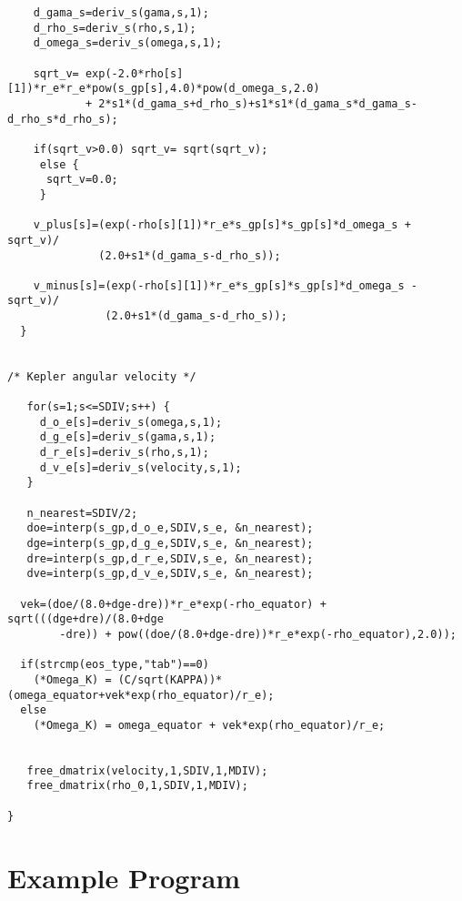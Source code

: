 \begin{verbatim}
    d_gama_s=deriv_s(gama,s,1);
    d_rho_s=deriv_s(rho,s,1);
    d_omega_s=deriv_s(omega,s,1);

    sqrt_v= exp(-2.0*rho[s][1])*r_e*r_e*pow(s_gp[s],4.0)*pow(d_omega_s,2.0) 
            + 2*s1*(d_gama_s+d_rho_s)+s1*s1*(d_gama_s*d_gama_s-d_rho_s*d_rho_s);

    if(sqrt_v>0.0) sqrt_v= sqrt(sqrt_v);
     else {
      sqrt_v=0.0;
     }

    v_plus[s]=(exp(-rho[s][1])*r_e*s_gp[s]*s_gp[s]*d_omega_s + sqrt_v)/
              (2.0+s1*(d_gama_s-d_rho_s));

    v_minus[s]=(exp(-rho[s][1])*r_e*s_gp[s]*s_gp[s]*d_omega_s - sqrt_v)/
               (2.0+s1*(d_gama_s-d_rho_s));
  }


/* Kepler angular velocity */

   for(s=1;s<=SDIV;s++) { 
     d_o_e[s]=deriv_s(omega,s,1);
     d_g_e[s]=deriv_s(gama,s,1);
     d_r_e[s]=deriv_s(rho,s,1);
     d_v_e[s]=deriv_s(velocity,s,1);
   }

   n_nearest=SDIV/2; 
   doe=interp(s_gp,d_o_e,SDIV,s_e, &n_nearest);
   dge=interp(s_gp,d_g_e,SDIV,s_e, &n_nearest);
   dre=interp(s_gp,d_r_e,SDIV,s_e, &n_nearest);
   dve=interp(s_gp,d_v_e,SDIV,s_e, &n_nearest);

  vek=(doe/(8.0+dge-dre))*r_e*exp(-rho_equator) + sqrt(((dge+dre)/(8.0+dge
        -dre)) + pow((doe/(8.0+dge-dre))*r_e*exp(-rho_equator),2.0));

  if(strcmp(eos_type,"tab")==0) 
    (*Omega_K) = (C/sqrt(KAPPA))*(omega_equator+vek*exp(rho_equator)/r_e);
  else 
    (*Omega_K) = omega_equator + vek*exp(rho_equator)/r_e;


   free_dmatrix(velocity,1,SDIV,1,MDIV);
   free_dmatrix(rho_0,1,SDIV,1,MDIV);

}
\end{verbatim}

\section{Example Program}

